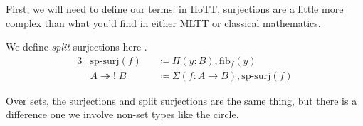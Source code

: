 First, we will need to define our terms: in HoTT, surjections are a little more
complex than what you'd find in either MLTT or classical mathematics.
\begin{definition} \label{split-surjections}
  We define \emph{split} surjections here \cite[definition
  4.6.1]{hottbook}. 
  \begin{alignat}{3}
    &\text{sp-surj}(f)          &&\coloneqq \Pi(y : B) , \text{fib}_f(y) \label{sp-surj-eqn} \\
    &A \twoheadrightarrow! \; B &&\coloneqq \Sigma (f : A \rightarrow B) , \text{sp-surj}(f) \label{sp-surj-arrow-eqn}
  \end{alignat}
\end{definition}
Over sets, the surjections and split surjections are the same thing, but there
is a difference one we involve non-set types like the circle.

